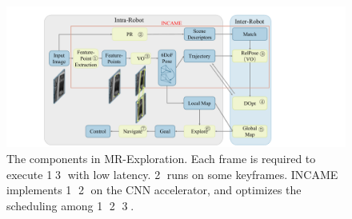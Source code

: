 \begin{figure}[t]
    \centering
	\includegraphics[width=0.99\linewidth]{fig/maexp.pdf}
     \caption{
        The components in MR-Exploration.  Each frame is required to execute \textcircled{1}\textcircled{3} with low latency. \textcircled{2} runs on some keyframes. INCAME implements \textcircled{1} \textcircled{2} on the CNN accelerator, and optimizes the scheduling among \textcircled{1} \textcircled{2} \textcircled{3}.
    }
	\label{fig:maexp}
\end{figure}






